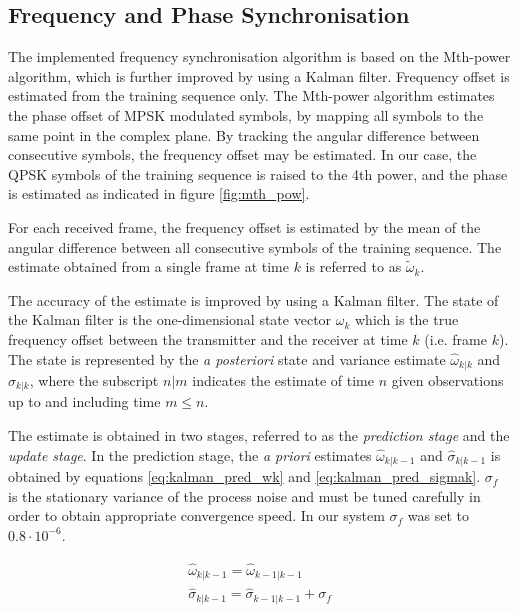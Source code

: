 \subsection{Frequency and Phase Synchronisation}
The implemented frequency synchronisation algorithm is based on the Mth-power algorithm, which is further improved by using a Kalman filter. Frequency offset is estimated from the training sequence only. The Mth-power algorithm estimates the phase offset of MPSK modulated symbols, by mapping all symbols to the same point in the complex plane. By tracking the angular difference between consecutive symbols, the frequency offset may be estimated. In our case, the QPSK symbols of the training sequence is raised to the 4th power, and the phase is estimated as indicated in figure \ref{fig:mth_pow}.


For each received frame, the frequency offset is estimated by the mean of the angular difference between all consecutive symbols of the training sequence. The estimate obtained from a single frame at time $k$  is referred to as $\widetilde{\omega}_k$.  

The accuracy of the estimate is improved by using a Kalman filter. The state of the Kalman filter is the one-dimensional state vector $\omega_k$ which is the true frequency offset between the transmitter and the receiver at time $k$ (i.e. frame $k$). The state is represented by the \textit{a posteriori} state and variance estimate $\widehat{\omega}_{k | k}$ and $\widehat{\sigma}_{k | k}$, where the subscript $n | m$ indicates the estimate of time $n$ given observations up to and including time $m \leq n$. 

The estimate is obtained in two stages, referred to as the \textit{prediction stage} and the \textit{update stage}. In the prediction stage, the \textit{a priori} estimates $\widehat{\omega}_{k | k-1}$ and $\widehat{\sigma}_{k | k-1}$ is obtained by equations \ref{eq:kalman_pred_wk} and \ref{eq:kalman_pred_sigmak}. $\sigma_f$ is the stationary variance of the process noise and must be tuned carefully in order to obtain appropriate convergence speed. In our system $\sigma_f$ was set to $0.8\cdot 10^{-6}$.  

\begin{gather}
\widehat{\omega}_{k | k-1} = \widehat{\omega}_{k-1 | k-1}  \label{eq:kalman_pred_wk} \\
\widehat{\sigma}_{k | k-1} = \widehat{\sigma}_{k-1 | k-1} + \sigma_f \label{eq:kalman_pred_sigmak} 
\end{gather} 

